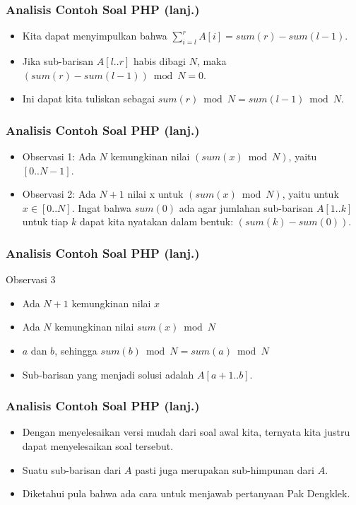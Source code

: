 \begin{frame}
\frametitle{Analisis Contoh Soal PHP (lanj.)}
\begin{itemize}
  \item Kita dapat menyimpulkan bahwa $\sum\limits_{i=l}^r A[i] = sum(r) - sum(l - 1)$.
  \newline
  \item Jika sub-barisan $A[l..r]$ habis dibagi $N$, maka $(sum(r) - sum(l - 1)) \bmod N = 0$.
  \newline
  \item Ini dapat kita tuliskan sebagai $sum(r) \bmod N = sum(l - 1) \bmod N$.
\end{itemize}
\end{frame}

\begin{frame}
\frametitle{Analisis Contoh Soal PHP (lanj.)}
\begin{itemize}
  \item Observasi 1: \newline
  Ada $N$ kemungkinan nilai $(sum(x) \bmod N)$, yaitu $[0..N-1]$.
  \item Observasi 2: \newline
  Ada $N+1$ nilai x untuk $(sum(x) \bmod N)$, yaitu untuk $x \in [0..N]$. \newline \newline
  Ingat bahwa $sum(0)$ ada agar jumlahan sub-barisan $A[1..k]$ untuk tiap $k$ dapat kita nyatakan dalam bentuk: $(sum(k) - sum(0))$.
\end{itemize}
\end{frame}

\begin{frame}
\frametitle{Analisis Contoh Soal PHP (lanj.)}
Observasi 3
\begin{itemize}
  \item Ada $N+1$ kemungkinan nilai $x$
  \item Ada $N$ kemungkinan nilai $sum(x) \bmod N$
  \item {} $a$ dan $b$, sehingga \newline $sum(b) \bmod N = sum(a) \bmod N$
  \item Sub-barisan yang menjadi solusi adalah $A[a+1..b]$.
\end{itemize}
\end{frame}

\begin{frame}
\frametitle{Analisis Contoh Soal PHP (lanj.)}
\begin{itemize}
  \item Dengan menyelesaikan versi mudah dari soal awal kita, ternyata kita justru dapat menyelesaikan soal tersebut.
  \item Suatu sub-barisan dari $A$ pasti juga merupakan sub-himpunan dari $A$.
  \item Diketahui pula bahwa  ada cara untuk menjawab pertanyaan Pak Dengklek.
\end{itemize}
\end{frame}

